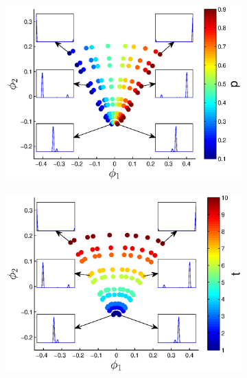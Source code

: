 \begin{figure}[t!]
\def \figwidth {0.3\textwidth}
\centering
\begin{subfigure}{\figwidth}
\includegraphics[width=\textwidth]{EMD_withhist_p_1}
\caption{}
\label{subfig:small_lambda_p}
\end{subfigure}
\begin{subfigure}{\figwidth}
\includegraphics[width=\textwidth]{EMD_withhist_t_1}
\caption{}
\label{subfig:small_lambda_t}
\end{subfigure}
\begin{subfigure}{\figwidth}

\end{subfigure}
\end{figure}
